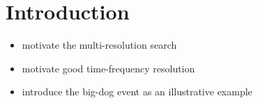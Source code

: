 \section{Introduction} \label{sec:introduction}
\begin{itemize}
\item motivate the multi-resolution search
\item motivate good time-frequency resolution
\item introduce the big-dog event as an illustrative example
\end{itemize}

